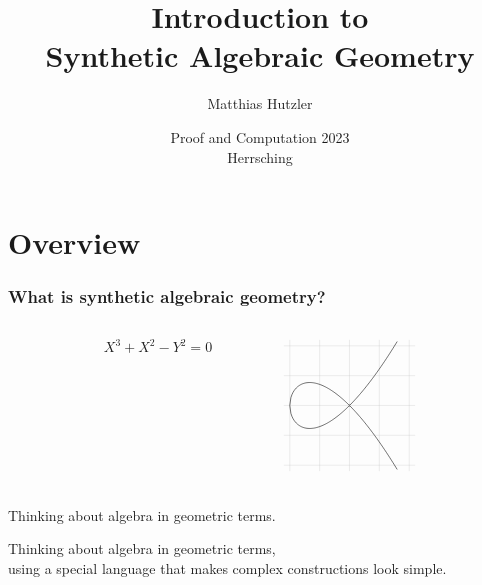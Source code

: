 \documentclass[aspectratio=1610]{beamer}
\author{Matthias Hutzler}
\title[Synthetic Algebraic Geometry]{Introduction to\\Synthetic Algebraic Geometry}
\date{Proof and Computation 2023\\Herrsching}
\begin{document}
\begin{frame}
  \maketitle
\end{frame}

\section{Overview}

\begin{frame}
  \frametitle{What is synthetic algebraic geometry?}

  \begin{columns}[c]
    \begin{column}{0.2\textwidth}
    \end{column}
    \begin{column}{0.3\textwidth}
      \[ X^3 + X^2 - Y^2 = 0 \]
    \end{column}
    \begin{column}{0.3\textwidth}
      \[\begin{tikzpicture}[scale=1.5,domain=-1.0:0.8,samples=101]
        \draw[very thin,color=lightgray,step=0.5] (-1.1,-1.1) grid (1.1,1.1);
        \draw plot (\x,{ sqrt(abs(\x*\x + \x*\x*\x))});
        \draw plot (\x,{-sqrt(abs(\x*\x + \x*\x*\x))});
      \end{tikzpicture}\]
    \end{column}
    \begin{column}{0.2\textwidth}
    \end{column}
  \end{columns}

  \bigskip
  \begin{description}
    \item[algebraic geometry]
      Thinking about algebra in geometric terms.
    \item<2->[synthetic algebraic geometry]
      Thinking about algebra in geometric terms,\\
      using a \alert{special language} that makes complex constructions look simple.
  \end{description}

  \bigskip
\end{frame}
\end{document}
